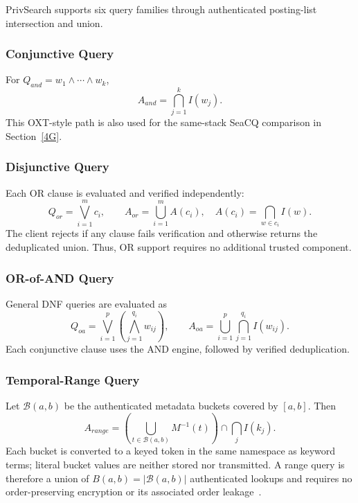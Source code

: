 \documentclass[journal]{IEEEtran}
\theoremstyle{tight}
\theoremstyle{remark}
\theoremstyle{plain}
\begin{document}
PrivSearch supports six query families through authenticated posting-list intersection and union.

\subsubsection{Conjunctive Query}
\label{3C1}

For \(Q_{and}=w_1\wedge\cdots\wedge w_k\),
\begin{equation}
A_{and}=\bigcap_{j=1}^{k}I(w_j).
\label{eq:qand}
\end{equation}
This OXT-style path is also used for the same-stack SeaCQ comparison in Section~\ref{4G}.

\subsubsection{Disjunctive Query}
\label{3C2}

Each OR clause is evaluated and verified independently:
\begin{equation}
Q_{or}=\bigvee_{i=1}^{m}c_i,\qquad
A_{or}=\bigcup_{i=1}^{m}A(c_i),\quad
A(c_i)=\bigcap_{w\in c_i}I(w).
\label{eq:qor}
\end{equation}
The client rejects if any clause fails verification and otherwise returns the deduplicated union. Thus, OR support requires no additional trusted component.

\subsubsection{OR-of-AND Query}
\label{3C3}

General DNF queries are evaluated as
\begin{equation}
Q_{oa}=\bigvee_{i=1}^{p}
\left(\bigwedge_{j=1}^{q_i}w_{ij}\right),
\qquad
A_{oa}=\bigcup_{i=1}^{p}\bigcap_{j=1}^{q_i}I(w_{ij}).
\label{eq:qoa}
\end{equation}
Each conjunctive clause uses the AND engine, followed by verified deduplication.

\subsubsection{Temporal-Range Query}
\label{3C4}

Let \(\mathcal{B}(a,b)\) be the authenticated metadata buckets covered by \([a,b]\). Then
\begin{equation}
A_{range}=
\left(\bigcup_{t\in\mathcal{B}(a,b)}M^{-1}(t)\right)
\cap\bigcap_j I(k_j).
\label{eq:qrange}
\end{equation}
Each bucket is converted to a keyed token in the same namespace as keyword terms; literal bucket values are neither stored nor transmitted. A range query is therefore a union of \(B(a,b)=|\mathcal{B}(a,b)|\) authenticated lookups and requires no order-preserving encryption or its associated order leakage~\cite{Naveed2015}.
\end{document}
